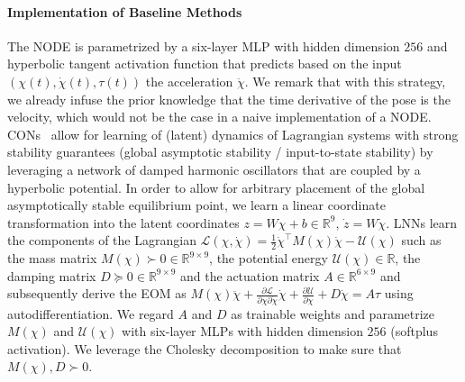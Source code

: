\paragraph{Implementation of Baseline Methods}
The \gls{NODE} is parametrized by a six-layer \gls{MLP} with hidden dimension $256$ and hyperbolic tangent activation function that predicts based on the input $(\chi(t), \dot{\chi}(t), \tau(t))$ the acceleration $\ddot{\chi}$. We remark that with this strategy, we already infuse the prior knowledge that the time derivative of the pose is the velocity, which would not be the case in a naive implementation of a \gls{NODE}.
\glspl{CON}~\citep{stolzle2024input} allow for learning of (latent) dynamics of Lagrangian systems with strong stability guarantees (global asymptotic stability / input-to-state stability) by leveraging a network of damped harmonic oscillators that are coupled by a hyperbolic potential. In order to allow for arbitrary placement of the global asymptotically stable equilibrium point, we learn a linear coordinate transformation into the latent coordinates $z = W \chi + b \in \mathbb{R}^9$, $\dot{z} = W \dot{\chi}$. %
\glspl{LNN} learn the components of the Lagrangian $\mathcal{L}(\chi, \dot{\chi}) = \frac{1}{2} \dot{\chi}^\top M(\chi) \dot{\chi} - \mathcal{U}(\chi)$ such as the mass matrix $M(\chi) \succ 0 \in \mathbb{R}^{9 \times 9}$, the potential energy $\mathcal{U}(\chi) \in \mathbb{R}$, the damping matrix $D \succeq 0 \in \mathbb{R}^{9 \times 9}$ and the actuation matrix $A \in \mathbb{R}^{6 \times 9}$ and subsequently derive the \gls{EOM} as $M(\chi) \ddot{\chi} + \frac{\partial \mathcal{L}}{\partial \chi \partial \dot{\chi}} \dot{\chi} + \frac{\partial \mathcal{U}}{\partial \chi} + D \dot{\chi} = A \tau$ using autodifferentiation.
We regard $A$ and $D$ as trainable weights and parametrize $M(\chi)$ and $\mathcal{U}(\chi)$ with six-layer \glspl{MLP} with hidden dimension $256$ (softplus activation). We leverage the Cholesky decomposition to make sure that $M(\chi), D \succ 0$.

